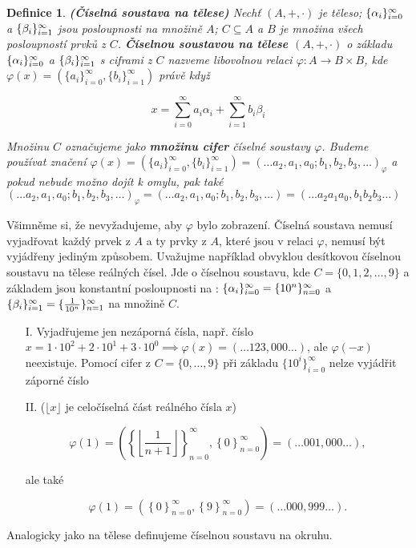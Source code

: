 \documentclass[12pt]{book}
\newtheorem{definice}{Definice}
\begin{document}
\begin{definice}\label{d2} \textbf{(Číselná soustava na tělese)}
	Nechť $(A,+,\cdot)$ je těleso; $\{\alpha_i\}_{i=0}^{\infty}$ a $\{\beta_i\}_{i=1}^{\infty}$ jsou posloupnosti na množině $A$; $C\subseteq A$ a $B$ je množina všech posloupností prvků z $C$.
	\textbf{Číselnou soustavou na tělese $(A,+,\cdot)$} o základu $\{\alpha_i\}_{i=0}^{\infty}$ a $\{\beta_i\}_{i=1}^{\infty}$ s ciframi z $C$ nazveme libovolnou relaci $\varphi : A \rightarrow B\times B$, kde 	$\varphi(x)=\left(\{a_{i}\}_{i=0}^{\infty},\{b_{i}\}_{i=1}^{\infty}\right)$ právě když
	
	$$x = \sum_{i=0}^{\infty} a_{i}\alpha_{i} + \sum_{i=1}^{\infty} b_{i}\beta_{i}$$
	
	Množinu $C$ označujeme jako \textbf{množinu cifer} číselné soustavy $\varphi$. Budeme používat značení $\varphi(x) = \left(\{a_{i}\}_{i=0}^{\infty},\{b_{i}\}_{i=1}^{\infty}\right) = (\dots a_2,a_1,a_0;b_1, b_2, b_3, \dots)_{\varphi}$ a pokud nebude možno dojít k omylu, pak také $(\dots a_2,a_1,a_0;b_1, b_2, b_3, \dots)_{\varphi} = (\dots a_2,a_1,a_0;b_1, b_2, b_3, \dots) = (\dots a_2a_1a_0,b_1 b_2 b_3 \dots)$
\end{definice}

Všimněme si, že nevyžadujeme, aby $\varphi$ bylo zobrazení. Číselná soustava nemusí vyjadřovat každý prvek z $A$ a ty prvky z $A$, které jsou v relaci $\varphi$, nemusí být vyjádřeny jediným způsobem. Uvažujme například obvyklou desítkovou číselnou soustavu na tělese reálných čísel. Jde o číselnou soustavu, kde $C = \{0, 1, 2, \dots, 9\}$ a základem jsou konstantní posloupnosti na : $\{\alpha_i\}_{i=0}^{\infty} = \{10^n\}_{n = 0}^{\infty}$ a $\{\beta_i\}_{i=1}^{\infty} = \{\frac{1}{10^n}\}_{n = 1}^{\infty}$ na množině $C$.

\begin{enumerate}
	
\item[I.] Vyjadřujeme jen nezáporná čísla, např. číslo $x = 1\cdot10^2 + 2\cdot10^1 + 3\cdot10^0 \implies \varphi(x) = (\dots123,000\dots)$, ale $\varphi(-x)$ neexistuje. Pomocí cifer z $C=\{0,\dots,9\}$ při základu $\{10^i\}_{i=0}^{\infty}$ nelze vyjádřit záporné číslo

\item[II.] ($\lfloor x\rfloor$ je celočíselná část reálného čísla $x$)

$$\varphi(1) = \left(  \left\{ \left\lfloor\frac{1}{n+1} \right\rfloor \right\}_{n = 0}^{\infty} , \left\{ 0 \right\}_{n = 0}^{\infty} \right) = \left(\dots 001,000 \dots \right),$$

ale také

$$\varphi(1) = \left(  \left\{ 0 \right\}_{n = 0}^{\infty} , \left\{ 9 \right\}_{n = 0}^{\infty} \right) = \left(\dots 000,999 \dots \right).$$

\end{enumerate}
Analogicky jako na tělese definujeme číselnou soustavu na okruhu.
\end{document}
